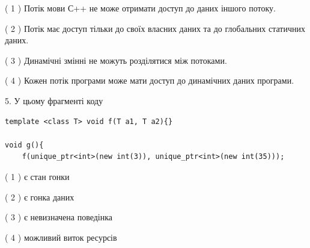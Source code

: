 \documentclass[12pt, ukrainian]{article}
\begin{document}
\begin {large}
{( 1 ) Потік мови С++ не може отримати доступ до даних іншого потоку.%

( 2 ) Потік має доступ тільки до своїх власних даних та до глобальних статичних даних.%

( 3 ) Динамічні змінні не можуть розділятися між потоками.%

( 4 ) Кожен потік програми може мати доступ до динамічних даних програми.%


5. У цьому фрагменті коду
\begin{verbatim}
template <class T> void f(T a1, T a2){}

void g(){
    f(unique_ptr<int>(new int(3)), unique_ptr<int>(new int(35)));
\end{verbatim}

( 1 ) є стан гонки%

( 2 ) є гонка даних%

( 3 ) є невизначена поведінка%

( 4 ) можливий виток ресурсів%
}
\end {large}
\end{document}
